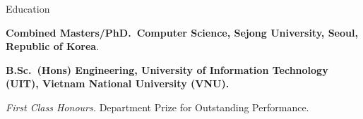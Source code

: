 \begin{rubric}{Education}


\entry*[2016 -- 2020]%
	\textbf{Combined Masters/PhD.~Computer Science, Sejong University, Seoul, Republic of Korea}.\par
	
%
\entry*[2011 -- 2016]%
	\textbf{B.Sc.~(Hons) Engineering, University of Information Technology (UIT), Vietnam National University (VNU).}\par
	\emph{First Class Honours.}  Department Prize for Outstanding Performance.
%
\end{rubric}
